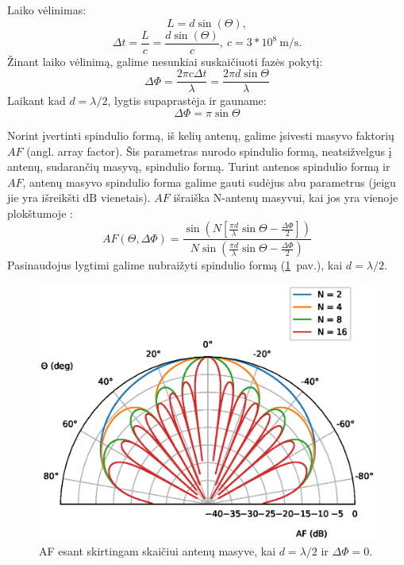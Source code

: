 \documentclass[main.tex]{subfiles}
\begin{document}
Laiko vėlinimas:
\begin{equation}
    L = d\sin(\Theta),
\end{equation}
\begin{equation}
    \Delta t = \frac{L}{c}=\frac{d\sin(\Theta)}{c},\ c = 3 * 10^8\ \mathrm{m/s}.
\end{equation}
Žinant laiko vėlinimą, galime nesunkiai suskaičiuoti fazės pokytį:
\begin{equation}
    \Delta \Phi = \frac{2\pi c \Delta t}{\lambda} = \frac{2\pi d \sin{\Theta}}{\lambda}
    \label{eq:phase_shift}
\end{equation}
Laikant kad $d = \lambda / 2$,  lygtis supaprastėja ir gauname:
\begin{equation}
    \Delta \Phi = \pi \sin{\Theta}
    \label{eq:phase_shift_antenna_angle}
\end{equation}

Norint įvertinti spindulio formą, iš kelių antenų, galime įsivesti masyvo faktorių
$AF$ (angl. array factor). Šis parametras nurodo spindulio formą, neatsižvelgus
į antenų, sudarančių masyvą, spindulio formą. Turint antenos spindulio formą
ir $AF$, antenų masyvo spindulio forma galime gauti sudėjus abu parametrus
(jeigu jie yra išreikšti $\mathrm{dB}$ vienetais).
$AF$ išraiška N-antenų masyvui, kai jos yra vienoje plokštumoje \cite{phase_array_handbook}:
\begin{equation}
    AF(\Theta,\Delta \Phi) = \frac{\sin{\left( N\left[ \frac{\pi d}{\lambda} \sin{\Theta} - \frac{\Delta \Phi}{2} \right] \right)}}{N \sin{\left( \frac{\pi d}{\lambda}\sin{\Theta}-\frac{\Delta \Phi}{2}\right)}}
    \label{eq:array_factor}
\end{equation}
Pasinaudojus  lygtimi galime nubraižyti spindulio formą (\ref{fig:af_polar_plot}~pav.), kai $d=\lambda /2$.

\begin{figure}[h]
    \begin{centering}
    \includegraphics[scale=0.8]{drawings/af_polar_plot}
    \par\end{centering}
    \protect\caption{\label{fig:af_polar_plot}AF esant skirtingam skaičiui antenų masyve, kai $d=\lambda / 2$ ir $\Delta \Phi = 0$.}
\end{figure}
\end{document}
